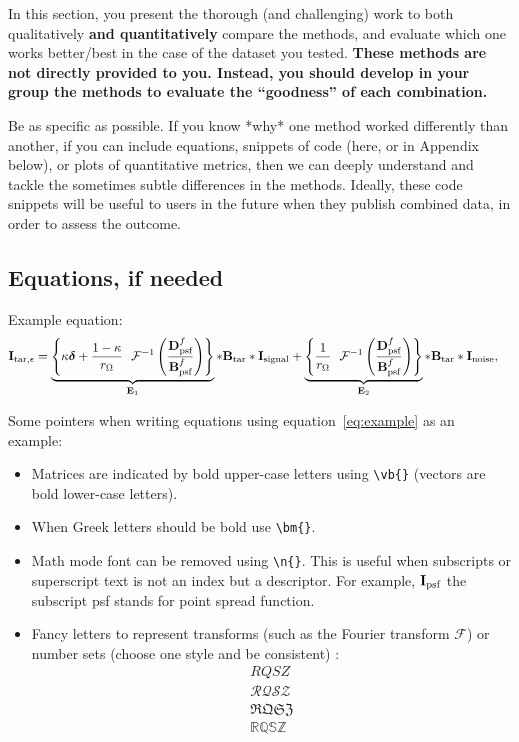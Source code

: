 \documentclass[12pt,a4paper]{article}
\newcommand{\vb}[1]{\text{\textbf{#1}}} %
\newcommand{\n}[1]{\text{{#1}}} %
\begin{document}
In this section, you present the thorough (and challenging) work to both qualitatively \textbf{and quantitatively} compare the methods, and evaluate which one works better/best in the case of the dataset you tested.  \textbf{These methods are not directly provided to you.  Instead, you should develop in your group the methods to evaluate the ``goodness'' of each combination.}

Be as specific as possible.  If you know *why* one method worked differently than another, if you can include equations, snippets of code (here, or in Appendix below), or plots of quantitative metrics, then we can deeply understand and tackle the sometimes subtle differences in the methods.  Ideally, these code snippets will be useful to users in the future when they publish combined data, in order to assess the outcome.  

\subsection{ Equations, if needed}

Example equation:
\begin{align}
\vb{I}_{\n{tar},\epsilon} &=  \underbrace{\left\lbrace \kappa \bm{\delta} + \frac{1-\kappa}{ r_\Omega} ~~\mathcal{F}^{-1} \left( \frac{\vb{D}^f_{\n{psf}}}{\vb{B}^f_{\n{psf}}} \right) \right\rbrace}_{\vb{E}_1} * \vb{B}_{\n{tar}} * \vb{I}_{\n{signal}} + \underbrace{ \left\lbrace \frac{1}{r_\Omega}  ~~\mathcal{F}^{-1}  \left(\frac{\vb{D}^f_{\n{psf}}}{\vb{B}^f_{\n{psf}}} \right) \right\rbrace}_{\vb{E}_2}  * \vb{B}_{\n{tar}} * \vb{I}_{\n{noise}}, \label{eq:example}
\end{align}

Some pointers when writing equations using equation~\ref{eq:example} as an example:
\begin{itemize}
\item Matrices are indicated by  bold upper-case letters using \texttt{\textbackslash vb\{\}} (vectors are bold lower-case letters). 
\item When Greek letters should be bold use  \texttt{\textbackslash bm\{\}}. 
\item Math mode font can be removed using \texttt{\textbackslash n\{\}}. This is useful when subscripts or superscript text is not an index but a descriptor. For example, $\vb{I}_{\n{psf}}$ the subscript psf stands for point spread function.
\item Fancy letters to represent transforms (such as the Fourier transform $\mathcal{F}$) or number sets (choose one style  and be consistent) :
\begin{align*}
RQSZ \\
\mathcal{RQSZ} \\
\mathfrak{RQSZ} \\
\mathbb{RQSZ}
\end{align*}
\end{itemize}
\end{document}
